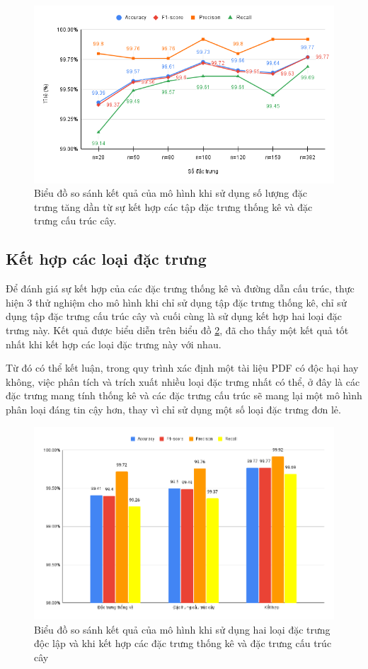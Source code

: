 \documentclass[./../main.tex]{subfiles}
\begin{document}
\begin{figure}[H]
	\centering
	\includegraphics[width=0.8\linewidth]{./images/exp1_top_all_feat.png}
	\caption{Biểu đồ so sánh kết quả của mô hình khi sử dụng số lượng đặc trưng tăng dần từ sự kết hợp các tập đặc trưng thống kê và đặc trưng cấu trúc cây.}
	\label{fig:exp1_top_all_feat}
\end{figure}


\subsection{Kết hợp các loại đặc trưng}

Để đánh giá sự kết hợp của các đặc trưng thống kê và đường dẫn cấu trúc, thực hiện 3 thử nghiệm cho mô hình khi chỉ sử dụng tập đặc trưng thống kê, chỉ sử dụng tập đặc trưng cấu trúc cây và cuối cùng là sử dụng kết hợp hai loại đặc trưng này. Kết quả được biểu diễn trên biểu đồ \ref{fig:exp1_compare_combination}, đã cho thấy một kết quả tốt nhất khi kết hợp các loại đặc trưng này với nhau.

Từ đó có thể kết luận, trong quy trình xác định một tài liệu PDF có độc hại hay không, việc phân tích và trích xuất nhiều loại đặc trưng nhất có thể, ở đây là các đặc trưng mang tính thống kê và các đặc trưng cấu trúc sẽ mang lại một mô hình phân loại đáng tin cậy hơn, thay vì chỉ sử dụng một số loại đặc trưng đơn lẻ.

\begin{figure}[H]
	\centering
	\includegraphics[width=\linewidth]{./images/exp1_compare_combination.png}
	\caption{Biểu đồ so sánh kết quả của mô hình khi sử dụng hai loại đặc trưng độc lập và khi kết hợp các đặc trưng thống kê và đặc trưng cấu trúc cây}
	\label{fig:exp1_compare_combination}
\end{figure}
\end{document}
